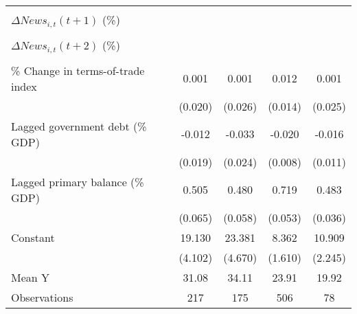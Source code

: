 {\begin{tabular}{l*{4}{c}}
                    &                     &                     &                     &                     \\
\addlinespace
$ \Delta News_{i,t}(t+1)$ (\%)&                     &                     &                     &                     \\
                    &                     &                     &                     &                     \\
\addlinespace
$ \Delta News_{i,t}(t+2)$ (\%)&                     &                     &                     &                     \\
                    &                     &                     &                     &                     \\
\addlinespace
\% Change in terms-of-trade index&       0.001         &       0.001         &       0.012         &       0.001         \\
                    &     (0.020)         &     (0.026)         &     (0.014)         &     (0.025)         \\
\addlinespace
Lagged government debt (\% GDP)&      -0.012         &      -0.033         &      -0.020\sym{**} &      -0.016         \\
                    &     (0.019)         &     (0.024)         &     (0.008)         &     (0.011)         \\
\addlinespace
Lagged primary balance (\% GDP)&       0.505\sym{***}&       0.480\sym{***}&       0.719\sym{***}&       0.483\sym{***}\\
                    &     (0.065)         &     (0.058)         &     (0.053)         &     (0.036)         \\
\addlinespace
Constant            &      19.130\sym{***}&      23.381\sym{***}&       8.362\sym{***}&      10.909\sym{***}\\
                    &     (4.102)         &     (4.670)         &     (1.610)         &     (2.245)         \\
\midrule
Mean Y              &       31.08         &       34.11         &       23.91         &       19.92         \\
Observations        &         217         &         175         &         506         &          78         \\
\bottomrule
\end{tabular}
}
